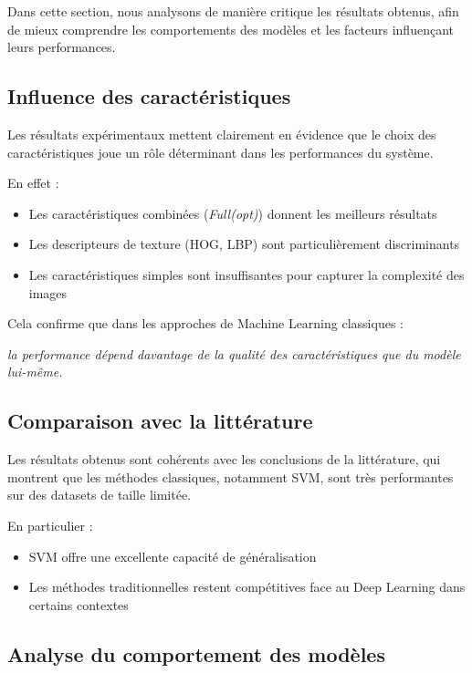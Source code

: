 \documentclass[12pt,a4paper]{article}
\begin{document}
    Dans cette section, nous analysons de manière critique les résultats obtenus, afin de mieux comprendre les comportements des modèles et les facteurs influençant leurs performances.

    \subsection{Influence des caractéristiques}

    Les résultats expérimentaux mettent clairement en évidence que le choix des caractéristiques joue un rôle déterminant dans les performances du système.

    En effet :
    \begin{itemize}
        \item Les caractéristiques combinées (\textit{Full(opt)}) donnent les meilleurs résultats
        \item Les descripteurs de texture (HOG, LBP) sont particulièrement discriminants
        \item Les caractéristiques simples sont insuffisantes pour capturer la complexité des images
    \end{itemize}

    Cela confirme que dans les approches de Machine Learning classiques :
    \begin{center}
    \textit{la performance dépend davantage de la qualité des caractéristiques que du modèle lui-même.}
    \end{center}

    \subsection{Comparaison avec la littérature}

    Les résultats obtenus sont cohérents avec les conclusions de la littérature, qui montrent que les méthodes classiques, notamment SVM, sont très performantes sur des datasets de taille limitée.

    En particulier :
    \begin{itemize}
        \item SVM offre une excellente capacité de généralisation
        \item Les méthodes traditionnelles restent compétitives face au Deep Learning dans certains contextes
    \end{itemize}

    \subsection{Analyse du comportement des modèles}
\end{document}
